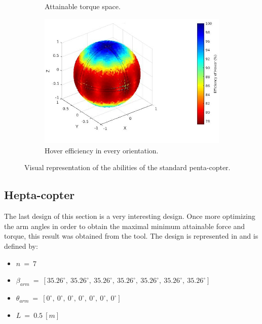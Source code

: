 \begin{figure}[!ht]
{\begin{subfigure}[b]{0.46\textwidth}
    \caption{Attainable torque space.} \label{fig:penta_standard_tspace}
  \end{subfigure}
  \begin{subfigure}[b]{0.47\textwidth}
    \includegraphics[width=\linewidth]{images/Penta_standard_hspace.jpg}
    \caption{Hover efficiency in every orientation.} \label{fig:penta_standard_hspace}
  \end{subfigure}}
  \caption{Visual representation of the abilities of the standard penta-copter.}
  \label{fig:penta_standard_spaces}
\end{figure}

\subsection{Hepta-copter}
\label{sec:hepta_copter}

The last design of this section is a very interesting design. Once more optimizing
the arm angles in order to obtain the maximal minimum attainable force and torque,
this result was obtained from the tool. The design is represented in
and is defined by:

{\scriptsize\begin{itemize}
  \item $n\ =\ 7$
  \item $\beta_{arm}\ =\ [35.26^{\circ},\  35.26^{\circ},\  35.26^{\circ},\  35.26^{\circ},\
                          35.26^{\circ},\  35.26^{\circ},\  35.26^{\circ}]$
  \item $\theta_{arm}\ =\ [0^{\circ},\  0^{\circ},\  0^{\circ},\  0^{\circ},\  0^{\circ},\
                            0^{\circ},\  0^{\circ}]$
  \item $L\ =\ 0.5\ [m]$
\end{itemize}}

